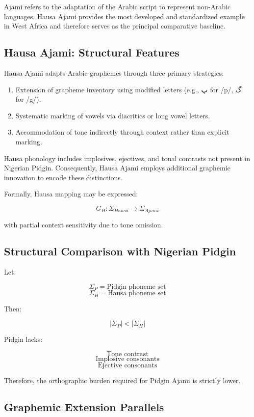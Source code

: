 \documentclass[12pt]{article}
\newcommand{\AR}[1]{\foreignlanguage{arabic}{#1}}
\begin{document}
Ajami refers to the adaptation of the Arabic script to represent non-Arabic languages. Hausa Ajami provides the most developed and standardized example in West Africa and therefore serves as the principal comparative baseline.

\subsection{Hausa Ajami: Structural Features}

Hausa Ajami adapts Arabic graphemes through three primary strategies:

\begin{enumerate}
\item Extension of grapheme inventory using modified letters (e.g., \AR{پ} for /p/, \AR{گ} for /g/).
\item Systematic marking of vowels via diacritics or long vowel letters.
\item Accommodation of tone indirectly through context rather than explicit marking.
\end{enumerate}

Hausa phonology includes implosives, ejectives, and tonal contrasts not present in Nigerian Pidgin. Consequently, Hausa Ajami employs additional graphemic innovation to encode these distinctions.

Formally, Hausa mapping may be expressed:

\[
G_H : \Sigma_{Hausa} \rightarrow \Sigma_{Ajami}
\]

with partial context sensitivity due to tone omission.

\subsection{Structural Comparison with Nigerian Pidgin}

Let:

\[
\Sigma_P = \text{Pidgin phoneme set}
\]
\[
\Sigma_H = \text{Hausa phoneme set}
\]

Then:

\[
|\Sigma_P| < |\Sigma_H|
\]

Pidgin lacks:

\[
\text{Tone contrast}
\]
\[
\text{Implosive consonants}
\]
\[
\text{Ejective consonants}
\]

Therefore, the orthographic burden required for Pidgin Ajami is strictly lower.

\subsection{Graphemic Extension Parallels}
\end{document}
